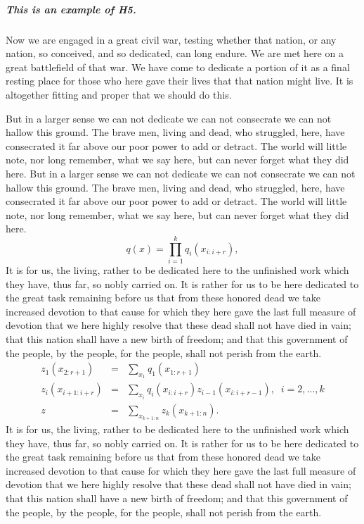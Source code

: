 \documentclass{roffin}
\begin{document}
\subparagraph{This is an example of H5.}
Now we are engaged in a great civil war, testing whether that nation, or any nation, so conceived, and so dedicated, can long endure.
We are met here on a great battlefield of that war. We have come to dedicate a portion of it as a final resting place for those who
here gave their lives that that nation might live. It is altogether fitting and proper that we should do this.

But in a larger sense we can not dedicate we can not consecrate we can not hallow this ground. The brave men, living and dead,
who struggled, here, have consecrated it far above our poor power to add or detract. The world will little note, nor long remember,
what we say here, but can never forget what they did here.
But in a larger sense we can not dedicate we can not consecrate we can not hallow this ground. The brave men, living and dead,
who struggled, here, have consecrated it far above our poor power to add or detract. The world will little note, nor long remember,
what we say here, but can never forget what they did here.
\[
q(x) = \prod_{i=1}^k q_i(x_{i:i+r}),
\]
It is for us, the living, rather to be dedicated here to the unfinished work
which they have, thus far, so nobly carried on. It is rather for us to be here dedicated to the great task remaining before us that
from these honored dead we take increased devotion to that cause for which they here gave the last full measure of devotion that
we here highly resolve that these dead shall not have died in vain; that this nation shall have a new birth of freedom; and that this
government of the people, by the people, for the people, shall not perish from the earth.
\begin{eqnarray}
 z_1(x_{2:r+1}) &=& \sum_{x_1} q_1(x_{1:r+1}) \label{eqn:for1} \\
 z_i(x_{i+1:i+r}) &=& \sum_{x_i} q_i(x_{i:i+r})z_{i-1}(x_{i:i+r-1}),
 \;\; i=2,\dots,k \label{eqn:fori} \\
 z &=& \sum_{x_{k+1:n}} z_k(x_{k+1:n}). \label{eqn:for2}
\end{eqnarray}
It is for us, the living, rather to be dedicated here to the unfinished work
which they have, thus far, so nobly carried on. It is rather for us to be here dedicated to the great task remaining before us that
from these honored dead we take increased devotion to that cause for which they here gave the last full measure of devotion that
we here highly resolve that these dead shall not have died in vain; that this nation shall have a new birth of freedom; and that this
government of the people, by the people, for the people, shall not perish from the earth.
\end{document}
